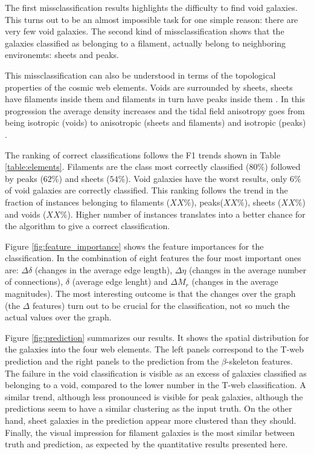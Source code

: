 \documentclass[usenatbib]{mnras}
\begin{document}
The first missclassification results highlights the difficulty to find
void galaxies.
This turns out to be an almost impossible task for one simple reason:
there are very few void galaxies.
The second kind of missclassification shows that the galaxies
classified as belonging to a filament, actually belong to neighboring
environemts: sheets and peaks.

This missclassification can also be understood in terms of the
topological properties of the cosmic web elements. 
Voids are surrounded by sheets, sheets have filaments inside them and
filaments in turn have peaks inside them \citep{Cautun2014}. 
In this progression the average density increases and the tidal field
anisotropy goes from being isotropic (voids) to anisotropic (sheets
and filaments) and isotropic (peaks) \citep{2015MNRAS.453..497B}.

The ranking of correct classifications follows the F1 trends
shown in Table \ref{table:elements}.
Filaments are the class most correctly classified ($80\%$) followed by
peaks ($62\%$) and sheets ($54\%$).
Void galaxies have the worst results, only $6\%$ of void galaxies are
correctly classified.
This ranking follows the trend in the fraction of instances belonging to
filaments ($XX\%$), peaks($XX\%$), sheets ($XX\%$) and voids ($XX\%$).
Higher number of instances translates into a better chance for the
algorithm to give a correct classification.


Figure \ref{fig:feature_importance} shows the feature
importances for the classification.
In the combination of eight features the four most important ones are:
$\Delta \delta$ (changes in the average edge length), $\Delta \eta$
(changes in the average number of connections), $\delta$ (average edge
lenght) and $\Delta M_r$ (changes in the average magnitudes).
The most interesting outcome is that the changes over the graph (the 
$\Delta$ features) turn out to be crucial for the classification, not
so much the actual values over the graph.

Figure  \ref{fig:prediction} summarizes our results. 
It shows the spatial distribution for the galaxies into the four web
elements. 
The left panels correspond to the T-web prediction and the right
panels to the prediction from the $\beta$-skeleton features.
The failure in the void classification is visible as an excess of
galaxies classified as belonging to a void, compared to the lower
number in the T-web classification.
A similar trend, although less pronounced is visible for peak
galaxies, although the predictions seem to have a similar clustering
as the input truth. 
On the other hand, sheet galaxies in the prediction appear more
clustered than they should.
Finally, the visual impression for filament galaxies is the most
similar between truth and prediction, as expected by the quantitative
results presented here.
\end{document}
